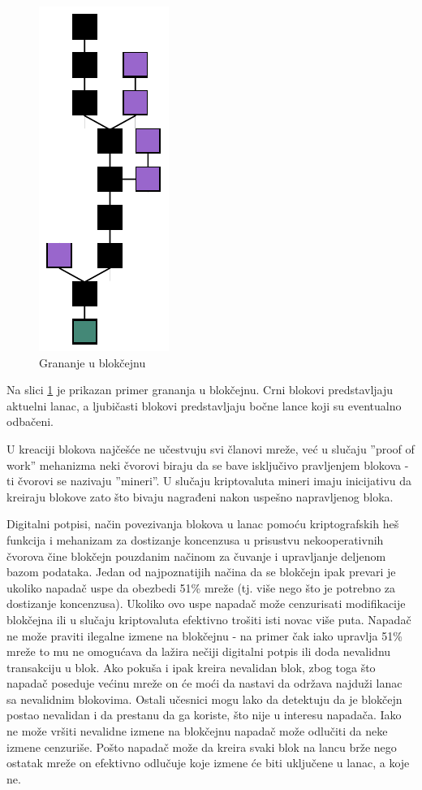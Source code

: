\documentclass[a4paper]{article}
\begin{document}
\begin{figure}[H]
    \centering
        \includegraphics[scale=0.7,angle=-90,origin=c]{blockchain_fork.pdf}
    \caption{Grananje u blokčejnu}
    \label{fig:blockchain_fork}
\end{figure}

Na slici \ref{fig:blockchain_fork} je prikazan primer grananja u blokčejnu. Crni blokovi predstavljaju aktuelni lanac,
a ljubičasti blokovi predstavljaju bočne lance koji su eventualno odbačeni.

U kreaciji blokova najčešće ne učestvuju svi članovi mreže, već u slučaju ''proof of work'' mehanizma neki čvorovi biraju
da se bave isključivo pravljenjem blokova - ti čvorovi se nazivaju ''mineri''. U slučaju kriptovaluta mineri imaju inicijativu
da kreiraju blokove zato što bivaju nagrađeni nakon uspešno napravljenog bloka.
 
Digitalni potpisi, način povezivanja blokova u lanac pomoću kriptografskih heš funkcija i mehanizam za dostizanje
koncenzusa u prisustvu nekooperativnih čvorova čine blokčejn pouzdanim načinom za čuvanje i upravljanje deljenom bazom podataka.
Jedan od najpoznatijih načina da se blokčejn ipak prevari je ukoliko napadač uspe da obezbedi 51\% mreže
(tj. više nego što je potrebno za dostizanje koncenzusa). Ukoliko ovo uspe napadač može cenzurisati modifikacije blokčejna
ili u slučaju kriptovaluta efektivno trošiti isti novac više puta. Napadač ne može praviti ilegalne
izmene na blokčejnu - na primer čak iako upravlja 51\% mreže to mu ne omogućava da lažira nečiji digitalni potpis
ili doda nevalidnu transakciju u blok. Ako pokuša i ipak kreira nevalidan blok, zbog toga što napadač poseduje
većinu mreže on će moći da nastavi da održava najduži lanac sa nevalidnim blokovima. Ostali učesnici
mogu lako da detektuju da je blokčejn postao nevalidan i da prestanu da ga koriste, što nije u interesu napadača.
Iako ne može vršiti nevalidne izmene na blokčejnu napadač može odlučiti da neke izmene cenzuriše.
Pošto napadač može da kreira svaki blok na lancu brže nego ostatak mreže on efektivno odlučuje koje izmene
će biti uključene u lanac, a koje ne.
\end{document}
